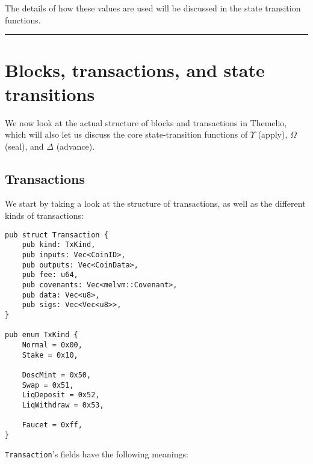 \documentclass[
]{article}
\newcommand{\passthrough}[1]{#1}
\begin{document}
The details of how these values are used will be discussed in the state
transition functions.

\begin{center}\rule{0.5\linewidth}{0.5pt}\end{center}

\hypertarget{blocks-transactions-and-state-transitions}{%
  \section{Blocks, transactions, and state
    transitions}\label{blocks-transactions-and-state-transitions}}

We now look at the actual structure of blocks and transactions in
Themelio, which will also let us discuss the core state-transition
functions of \(\Upsilon\) (apply), \(\Omega\) (seal), and \(\Delta\)
(advance).

\hypertarget{transactions}{%
  \subsection{Transactions}\label{transactions}}

We start by taking a look at the structure of transactions, as well as
the different kinds of transactions:

\begin{lstlisting}
pub struct Transaction {
    pub kind: TxKind,
    pub inputs: Vec<CoinID>,
    pub outputs: Vec<CoinData>,
    pub fee: u64,
    pub covenants: Vec<melvm::Covenant>,
    pub data: Vec<u8>,
    pub sigs: Vec<Vec<u8>>,
}

pub enum TxKind {
    Normal = 0x00,
    Stake = 0x10,

    DoscMint = 0x50,
    Swap = 0x51,
    LiqDeposit = 0x52,
    LiqWithdraw = 0x53,

    Faucet = 0xff,
}
\end{lstlisting}

\passthrough{\lstinline!Transaction!}'s fields have the following
meanings:
\end{document}
